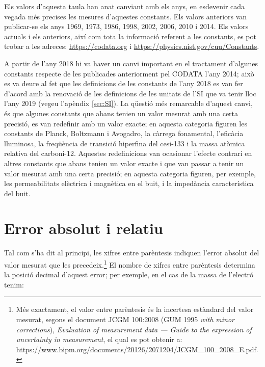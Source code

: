  
Els valors d'aquesta taula  han anat canviant amb els anys, en esdevenir cada vegada més precises les mesures d'aquestes constants. Els valors anteriors van publicar-se els anys 1969, 1973, 1986, 1998, 2002, 2006, 2010 i 2014.  Els  valors actuals i els anteriors, així com tota la informació referent a les constants, es pot trobar   a
les adreces: \href{https://codata.org//}{https://codata.org} i \href{https://physics.nist.gov/cuu/Constants/}{https://physics.nist.gov/cuu/Constants}.


A partir de l'any 2018 hi va haver un canvi important en el tractament d'algunes constants respecte de les publicades anteriorment pel CODATA l'any 2014; això es va deure al fet que les definicions de les constants de l'any 2018 es van fer d'acord amb la renovació de les definicions de les unitats de l'SI que va tenir lloc l'any 2019 (vegeu l'apèndix \ref{sec:SI}). La qüestió més remarcable d'aquest canvi, és que algunes constants que abans tenien un valor mesurat amb una certa precisió, es van redefinir amb un valor exacte; en aquesta categoria figuren les constants de Planck, Boltzmann i Avogadro, la càrrega fonamental, l'eficàcia lluminosa, la freqüència de transició hiperfina del cesi-133 i la massa atòmica relativa del carboni-12. Aquestes redefinicions van ocasionar l'efecte contrari en altres constants que abans tenien un valor exacte i que van passar a tenir un valor mesurat amb una certa precisió; en aquesta categoria figuren, per exemple, les permeabilitats elèctrica i magnètica en el buit, i la impedància característica del buit.


\section{Error absolut i relatiu}\label{sec:err_abs_rel}

Tal com s'ha dit al principi, les xifres entre parèntesis indiquen l'error absolut del valor mesurat que les precedeix.\footnote{Més exactament, el valor entre parèntesis és la incertesa estàndard del valor mesurat, segons el document JCGM 100:2008 (GUM 1995 \textit{with minor
corrections}), \textit{Evaluation of measurement data --- Guide to the expression of uncertainty in
measurement}, el qual es pot obtenir a:  \href{https://www.bipm.org/documents/20126/2071204/JCGM_100_2008_E.pdf/}{https://www.bipm.org/documents/20126/2071204/JCGM\_100\_2008\_E.pdf}.} El nombre de xifres entre parèntesis determina la posició decimal d'aquest error; per exemple, en el cas de la  massa de l'electró tenim:

